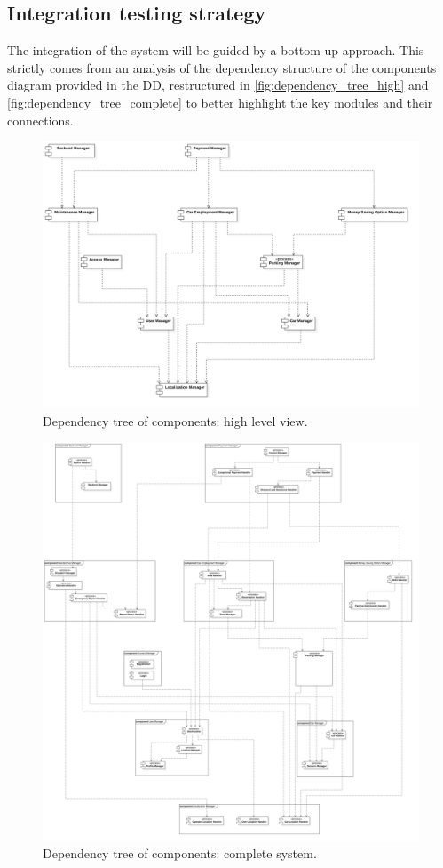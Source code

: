 \subsection{Integration testing strategy}
\label{sec:integration_testing_strategy}
	The integration of the system will be guided by a bottom-up approach. This strictly comes from an analysis of the dependency structure of the components diagram provided in the DD, restructured in \autoref{fig:dependency_tree_high} and \autoref{fig:dependency_tree_complete} to better highlight the key modules and their connections.
	\begin{figure}[h]
		\includegraphics[width=\textwidth, center]{img/integration_strategy/high_level_unravelled.png}
		\caption{Dependency tree of components: high level view.}
		\label{fig:dependency_tree_high}
	\end{figure}
	\begin{figure}[h]
		\includegraphics[width=\textwidth, center]{img/integration_strategy/complete_unravelled.png}
		\caption{Dependency tree of components: complete system.}
		\label{fig:dependency_tree_complete}
	\end{figure}

